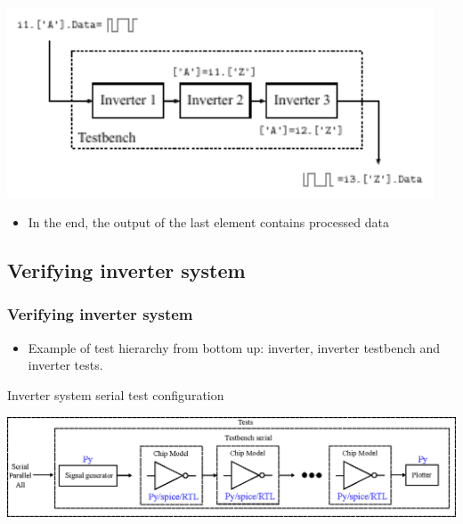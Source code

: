 \documentclass{sdkslides}
\begin{document}
\begin{frame}[t]
    \frametitle{\sectionname}
    \begin{center}
        \includegraphics[width=0.95\textwidth]{Pics/inverter_chain_5}
    \end{center}
    \begin{itemize}
        \item In the end, the output of the last element contains processed data
    \end{itemize}
\end{frame}


\renewcommand{\sectionname}{Verifying inverter system}
\subsection*{\sectionname}
\begin{frame}[t]
    \frametitle{\sectionname}
    \begin{itemize}
        \item Example of test hierarchy from bottom up: inverter, inverter
            testbench and inverter tests. 
    \end{itemize}
    \begin{block}{Inverter system serial test configuration}
        \begin{center}
            \includegraphics[width=\textwidth]{./Pics/Inverter_chain.eps}
        \end{center}
    \end{block}
\end{frame}
\end{document}
